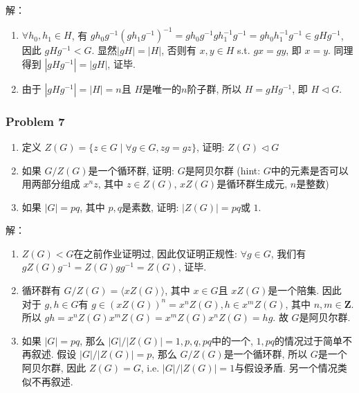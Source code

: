 \documentclass[a4paper,12pt]{ctexart}
\newcommand{\Z}{\mathbf{Z}}
\begin{document}
    解：
    \begin{enumerate}
      \item $ \forall h_0,h_1\in H $, 有 $ gh_0g^{-1}(gh_1g^{-1})^{-1}=gh_0g^{-1}gh_1^{-1}g^{-1}=gh_0h_1^{-1}g^{-1}\in gHg^{-1} $, 因此 $ gHg^{-1}<G $. 显然$ |gH|=|H| $, 否则有 $ x,y\in H $ s.t. $ gx=gy $, 即 $ x=y $. 同理得到 $ |gHg^{-1}|=|gH| $, 证毕.
      \item 由于 $ |gHg^{-1}|=|H|=n $且 $H$是唯一的$ n $阶子群, 所以 $ H=gHg^{-1} $, 即 $ H\triangleleft G $.
    \end{enumerate}
\subsubsection*{Problem 7}
\begin{enumerate}
  \item 定义 $ Z(G)=\{z\in G\mid \forall g\in G, zg=gz\} $, 证明: $ Z(G)\triangleleft G $
  \item 如果 $ G/Z(G) $是一个循环群, 证明: $ G $是阿贝尔群 (hint: $ G $中的元素是否可以用两部分组成 $ x^nz $, 其中 $ z\in Z(G) $, $ xZ(G) $是循环群生成元, $ n $是整数)
  \item 如果 $ \lvert G\rvert=pq $, 其中 $ p,q $是素数, 证明: $ \lvert Z(G)\rvert=pq $或 $ 1 $.
\end{enumerate}

解：
    \begin{enumerate}
      \item $ Z(G)<G $在之前作业证明过, 因此仅证明正规性: $ \forall g\in G $, 我们有 $ gZ(G)g^{-1}=Z(G)gg^{-1}=Z(G) $, 证毕.
      \item 循环群有 $ G/Z(G)=\langle xZ(G)\rangle $, 其中 $ x\in G $且 $ xZ(G) $是一个陪集. 因此
      对于 $ g,h\in G $有 $ g\in(xZ(G))^n=x^nZ(G),h\in x^mZ(G) $, 其中 $ n,m\in\Z $. 所以 $ gh=x^nZ(G)x^mZ(G)=x^mZ(G)x^nZ(G)=hg $. 故 $ G $是阿贝尔群.
      \item 如果 $ |G|=pq $, 那么 $ |G|/|Z(G)|=1,p,q,pq $中的一个, $ 1,pq $的情况过于简单不再叙述. 假设 $ |G|/|Z(G)|=p $, 那么 $ G/Z(G) $是一个循环群, 所以 $ G $是一个阿贝尔群, 因此 $ Z(G)=G $, i.e. $ |G|/|Z(G)|=1 $与假设矛盾. 另一个情况类似不再叙述. 
    \end{enumerate}
\end{document}
